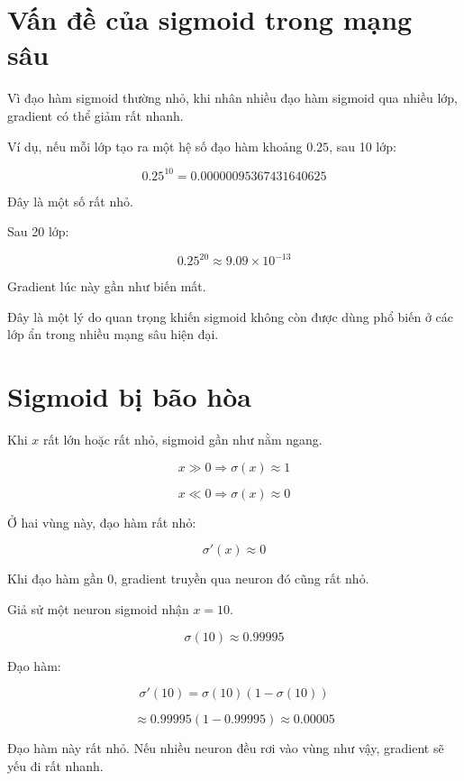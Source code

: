 \documentclass[12pt,a4paper]{report}
\begin{document}
\section{Vấn đề của sigmoid trong mạng sâu}

Vì đạo hàm sigmoid thường nhỏ, khi nhân nhiều đạo hàm sigmoid qua nhiều lớp, gradient có thể giảm rất nhanh.

Ví dụ, nếu mỗi lớp tạo ra một hệ số đạo hàm khoảng $0.25$, sau 10 lớp:

\[
    0.25^{10}
    =
    0.00000095367431640625
\]

Đây là một số rất nhỏ.

Sau 20 lớp:

\[
    0.25^{20}
    \approx 9.09 \times 10^{-13}
\]

Gradient lúc này gần như biến mất.

\begin{canhbao}
Đây là một lý do quan trọng khiến sigmoid không còn được dùng phổ biến ở các lớp ẩn trong nhiều mạng sâu hiện đại.
\end{canhbao}

\section{Sigmoid bị bão hòa}

Khi $x$ rất lớn hoặc rất nhỏ, sigmoid gần như nằm ngang.

\[
    x \gg 0 \Rightarrow \sigma(x)\approx 1
\]

\[
    x \ll 0 \Rightarrow \sigma(x)\approx 0
\]

Ở hai vùng này, đạo hàm rất nhỏ:

\[
    \sigma'(x)\approx 0
\]

Khi đạo hàm gần 0, gradient truyền qua neuron đó cũng rất nhỏ.

\begin{vidu}
Giả sử một neuron sigmoid nhận $x=10$.

\[
    \sigma(10)\approx 0.99995
\]

Đạo hàm:

\[
    \sigma'(10)
    =
    \sigma(10)(1-\sigma(10))
\]

\[
    \approx
    0.99995(1-0.99995)
    \approx 0.00005
\]

Đạo hàm này rất nhỏ. Nếu nhiều neuron đều rơi vào vùng như vậy, gradient sẽ yếu đi rất nhanh.
\end{vidu}

\end{document}
